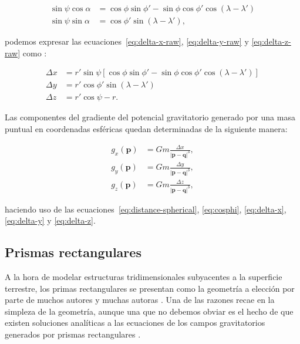 \begin{align}
    \sin\psi \cos\alpha &=
        \cos\phi \sin\phi' - \sin\phi \cos\phi' \cos(\lambda - \lambda') \\
    \sin\psi \sin\alpha &=
        \cos\phi' \sin(\lambda - \lambda'),
\end{align}

\noindent podemos expresar las ecuaciones~\ref{eq:delta-x-raw},
\ref{eq:delta-y-raw} y \ref{eq:delta-z-raw} como \citep{grombein2013}:

\begin{align}
    \Delta x &= r' \sin\psi \left[
        \cos\phi \sin\phi' - \sin\phi \cos\phi' \cos(\lambda - \lambda')
        \right]
    \label{eq:delta-x}
    \\
    \Delta y &= r' \cos\phi' \sin(\lambda - \lambda')
    \label{eq:delta-y}
    \\
    \Delta z &= r'\cos\psi - r.
    \label{eq:delta-z}
\end{align}

Las componentes del gradiente del potencial gravitatorio generado por una masa
puntual en coordenadas esféricas quedan determinadas de la siguiente manera:

\begin{align}
    g_x(\mathbf{p}) &=
        G m
        \frac{\Delta x}{|\mathbf{p} - \mathbf{q}|^3},
    \label{eq:gx-particula-spherical}
    \\
    g_y(\mathbf{p}) &=
        G m
        \frac{\Delta y}{|\mathbf{p} - \mathbf{q}|^3},
    \label{eq:gy-particula-spherical}
    \\
    g_z(\mathbf{p}) &=
        G m
        \frac{\Delta z}{|\mathbf{p} - \mathbf{q}|^3},
    \label{eq:gz-particula-spherical}
\end{align}

\noindent haciendo uso de las ecuaciones~\ref{eq:distance-spherical},
\ref{eq:cosphi}, \ref{eq:delta-x}, \ref{eq:delta-y} y \ref{eq:delta-z}.


\subsection{Prismas rectangulares}

A la hora de modelar estructuras tridimensionales subyacentes a la superficie
terrestre, los primas rectangulares se presentan como la geometría a elección
por parte de muchos autores y muchas autoras \citep{}.
Una de las razones recae en la simpleza de la geometría, aunque una que no
debemos obviar es el hecho de que existen soluciones analíticas a las
ecuaciones de los campos gravitatorios generados por prismas rectangulares
\citep{nagy2000,nagy2002}.

